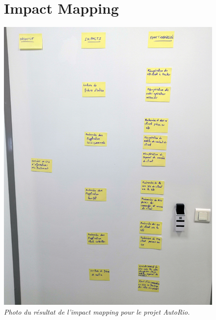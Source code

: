 \documentclass[a4paper,twoside,12pt]{report}
\begin{document}
\chapter{Impact Mapping}
\begin{center}
\includegraphics[height=15cm]{impactMappingRIO.jpg}\\
\itshape Photo du résultat de l'impact mapping pour le projet AutoRio.
\end{center}
\end{document}
